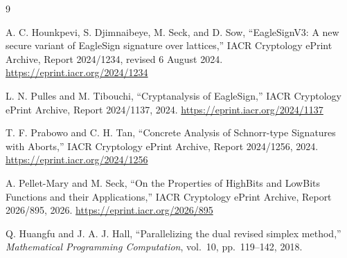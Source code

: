 \documentclass[10pt,a4paper]{article}
\begin{document}
\begin{thebibliography}{9}

A. C. Hounkpevi, S. Djimnaibeye, M. Seck, and D. Sow,
``EagleSignV3: A new secure variant of EagleSign signature over lattices,''
IACR Cryptology ePrint Archive, Report 2024/1234, revised 6 August 2024.
\url{https://eprint.iacr.org/2024/1234}

L. N. Pulles and M. Tibouchi,
``Cryptanalysis of EagleSign,''
IACR Cryptology ePrint Archive, Report 2024/1137, 2024.
\url{https://eprint.iacr.org/2024/1137}

T. F. Prabowo and C. H. Tan,
``Concrete Analysis of Schnorr-type Signatures with Aborts,''
IACR Cryptology ePrint Archive, Report 2024/1256, 2024.
\url{https://eprint.iacr.org/2024/1256}

A. Pellet-Mary and M. Seck,
``On the Properties of HighBits and LowBits Functions and their
Applications,''
IACR Cryptology ePrint Archive, Report 2026/895, 2026.
\url{https://eprint.iacr.org/2026/895}

Q. Huangfu and J. A. J. Hall,
``Parallelizing the dual revised simplex method,''
\emph{Mathematical Programming Computation}, vol.~10, pp.~119--142, 2018.

\end{thebibliography}
\end{document}
